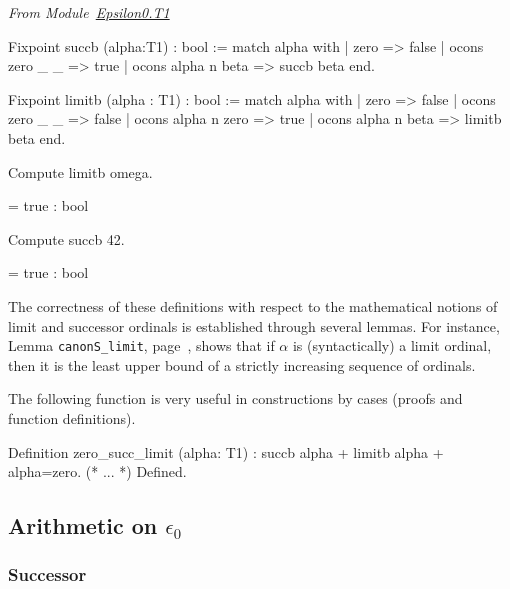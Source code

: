 \vspace{4pt}
\noindent
\emph{From Module~\href{../theories/html/hydras.Epsilon0.T1.html\#succb}{Epsilon0.T1}}

\begin{Coqsrc}
Fixpoint succb (alpha:T1) : bool :=
  match alpha with
    | zero => false
    | ocons zero _ _ => true
    | ocons alpha n beta => succb beta
  end.

Fixpoint limitb (alpha : T1) : bool :=
  match alpha with
    | zero => false
    | ocons zero _ _ => false
    | ocons alpha n zero => true
    | ocons alpha n beta => limitb beta
  end.
\end{Coqsrc}



\begin{Coqsrc}
  Compute limitb omega.
\end{Coqsrc}

\begin{Coqanswer}
  = true
     : bool
\end{Coqanswer}

\begin{Coqsrc}
Compute succb 42.
\end{Coqsrc}

\begin{Coqanswer}
  = true
     : bool
\end{Coqanswer}

The correctness of these definitions with respect to the mathematical notions of
limit and successor ordinals is established through several lemmas. For instance,
Lemma \texttt{canonS\_limit}, page~\pageref{lemma:canonS-limit}, shows that
if $\alpha$ is (syntactically) a limit ordinal, then it is the least upper bound of
a strictly increasing sequence of ordinals.


   The following function is very useful in constructions by cases (proofs and function definitions).
   
\begin{Coqsrc}
Definition zero_succ_limit (alpha: T1) :
    {succb alpha} + {limitb alpha} +  {alpha=zero}.
    (* ... *)
Defined.
\end{Coqsrc}



\subsection{Arithmetic on \texorpdfstring{$\epsilon_0$}{epsilon0}}
\subsubsection{Successor}

